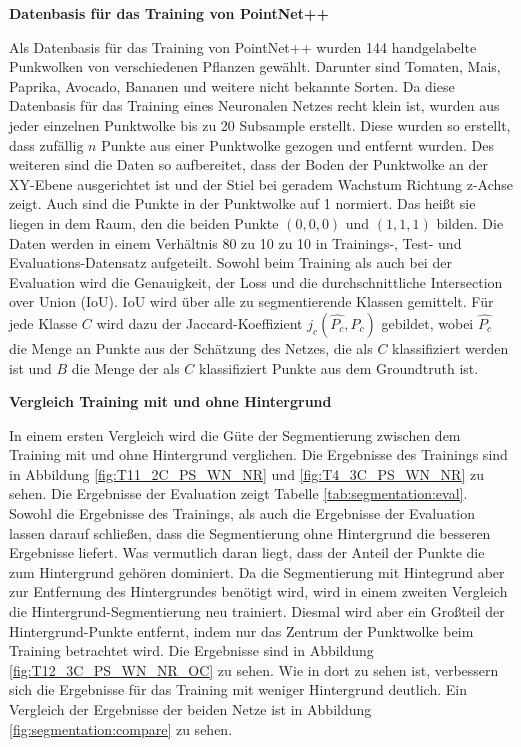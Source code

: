 \documentclass[12pt,titlepage, twoside]{article}
\begin{document}
\textbf{Datenbasis für das Training von PointNet++}

Als Datenbasis für das Training von PointNet++ wurden 144 handgelabelte Punkwolken von verschiedenen Pflanzen gewählt. Darunter sind Tomaten, Mais, Paprika, Avocado, Bananen und weitere nicht bekannte Sorten. 
Da diese Datenbasis für das Training eines Neuronalen Netzes recht klein ist, wurden aus jeder einzelnen Punktwolke bis zu 20 Subsample erstellt. 
Diese wurden so erstellt, dass zufällig $n$ Punkte aus einer Punktwolke gezogen und entfernt wurden.
Des weiteren sind die Daten so aufbereitet, dass der Boden der Punktwolke an der XY-Ebene ausgerichtet ist und der Stiel bei geradem Wachstum Richtung z-Achse zeigt. 
Auch sind die Punkte in der Punktwolke auf 1 normiert. 
Das heißt sie liegen in dem Raum, den die beiden Punkte $(0,0,0)$ und $(1,1,1)$ bilden. Die Daten werden in einem Verhältnis 80 zu 10 zu 10 in Trainings-, Test- und Evaluations-Datensatz aufgeteilt.
Sowohl beim Training als auch bei der Evaluation wird die Genauigkeit, der Loss und die durchschnittliche Intersection over Union (IoU). IoU wird über alle zu segmentierende Klassen gemittelt.
Für jede Klasse $C$ wird dazu der Jaccard-Koeffizient $j_c(\hat{P_c},P_c)$ gebildet, wobei $\hat{P_c}$ die Menge an Punkte aus der Schätzung des Netzes, die als $C$ klassifiziert werden ist und $B$ 
die Menge der als $C$ klassifiziert Punkte aus dem Groundtruth ist.

\textbf{Vergleich Training mit und ohne Hintergrund}

In einem ersten Vergleich wird die Güte der Segmentierung zwischen dem Training mit und ohne Hintergrund verglichen. 
Die Ergebnisse des Trainings sind in Abbildung \ref{fig:T11_2C_PS_WN_NR} und \ref{fig:T4_3C_PS_WN_NR} zu sehen.
Die Ergebnisse der Evaluation zeigt Tabelle \ref{tab:segmentation:eval}. 
Sowohl die Ergebnisse des Trainings, als auch die Ergebnisse der Evaluation lassen darauf schließen, dass die Segmentierung ohne Hintergrund die besseren Ergebnisse liefert.
Was vermutlich daran liegt, dass der Anteil der Punkte die zum Hintergrund gehören dominiert.
Da die Segmentierung mit Hintegrund aber zur Entfernung des Hintergrundes benötigt wird, wird in einem zweiten Vergleich die Hintergrund-Segmentierung neu trainiert. 
Diesmal wird aber ein Großteil der Hintergrund-Punkte entfernt, indem nur das Zentrum der Punktwolke beim Training betrachtet wird. Die Ergebnisse sind in Abbildung \ref{fig:T12_3C_PS_WN_NR_OC} zu sehen.
Wie in dort zu sehen ist, verbessern sich die Ergebnisse für das Training mit weniger Hintergrund deutlich. Ein Vergleich der Ergebnisse der beiden Netze ist in Abbildung \ref{fig:segmentation:compare} zu sehen.
\end{document}
